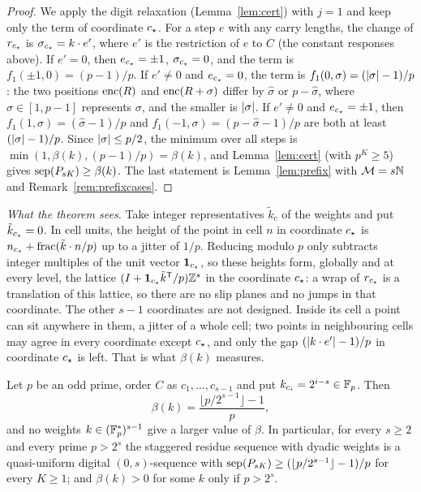 \begin{proof}
We apply the digit relaxation (Lemma~\ref{lem:cert}) with $j=1$ and keep only the term of coordinate $c_{\star}$. For a step $e$ with any carry lengths, the change of $r_{c_{\star}}$ is $\sigma_{c_{\star}}=k\cdot e'$, where $e'$ is the restriction of $e$ to $C$ (the constant responses above). If $e'=0$, then $e_{c_{\star}}=\pm1$, $\sigma_{c_{\star}}=0$, and the term is $f_1(\pm1,0)=(p-1)/p$. If $e'\ne0$ and $e_{c_{\star}}=0$, the term is $f_1(0,\sigma)=(\lvert \sigma\rvert-1)/p$: the two positions $\operatorname{enc}(R)$ and $\operatorname{enc}(R+\sigma)$ differ by $\hat\sigma$ or $p-\hat\sigma$, where $\hat\sigma\in[1,p-1]$ represents $\sigma$, and the smaller is $\lvert \sigma\rvert$. If $e'\ne0$ and $e_{c_{\star}}=\pm1$, then $f_1(1,\sigma)=(\hat\sigma-1)/p$ and $f_1(-1,\sigma)=(p-\hat\sigma-1)/p$ are both at least $(\lvert \sigma\rvert-1)/p$. Since $\lvert \sigma\rvert\le p/2$, the minimum over all steps is $\min(1,\beta(k),(p-1)/p)=\beta(k)$, and Lemma~\ref{lem:cert} (with $p^K\ge5$) gives $\operatorname{sep}(P_{sK})\ge\beta(k)$. The last statement is Lemma~\ref{lem:prefix} with $\mathcal{M}=s\mathbb{N}$ and Remark~\ref{rem:prefixcases}.
\end{proof}

\emph{What the theorem sees.} Take integer representatives $\tilde k_c$ of the weights and put $\tilde k_{c_{\star}}=0$. In cell units, the height of the point in cell $n$ in coordinate $c_{\star}$ is $n_{c_{\star}}+\operatorname{frac}(\tilde k\cdot n/p)$ up to a jitter of $1/p$. Reducing modulo $p$ only subtracts integer multiples of the unit vector $\mathbf 1_{c_{\star}}$, so these heights form, globally and at every level, the lattice $(I+\mathbf 1_{c_{\star}}\tilde k^{\mathsf T}/p)\mathbb{Z}^s$ in the coordinate $c_{\star}$: a wrap of $r_{c_{\star}}$ is a translation of this lattice, so there are no slip planes and no jumps in that coordinate. The other $s-1$ coordinates are not designed. Inside its cell a point can sit anywhere in them, a jitter of a whole cell; two points in neighbouring cells may agree in every coordinate except $c_{\star}$, and only the gap $(\lvert k\cdot e'\rvert-1)/p$ in coordinate $c_{\star}$ is left. That is what $\beta(k)$ measures.

\begin{corollary}\label{cor:dyadic}
Let $p$ be an odd prime, order $C$ as $c_1,\dots,c_{s-1}$ and put $k_{c_i}=2^{i-s}\in\mathbb{F}_p$. Then
\[
\beta(k)=\frac{\lfloor p/2^{s-1}\rfloor-1}{p},
\]
and no weights $k\in(\mathbb{F}_p^*)^{s-1}$ give a larger value of $\beta$. In particular, for every $s\ge2$ and every prime $p>2^s$ the staggered residue sequence with dyadic weights is a quasi-uniform digital $(0,s)$-sequence with $\operatorname{sep}(P_{sK})\ge(\lfloor p/2^{s-1}\rfloor-1)/p$ for every $K\ge1$; and $\beta(k)>0$ for some $k$ only if $p>2^s$.
\end{corollary}

